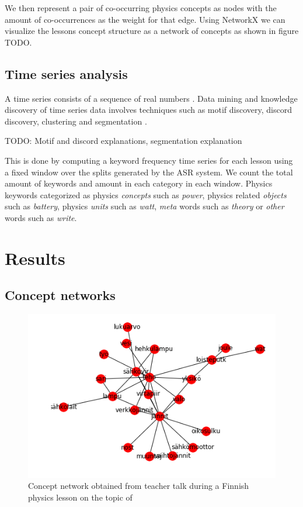 \documentclass[utf8,english]{gradu3}
\begin{document}
We then represent a pair of co-occurring physics concepts as nodes with the amount of co-occurrences as the weight for that edge. Using NetworkX \parencite{hagbergExploringNetworkStructure2008} we can visualize the lessons concept structure as a network of concepts as shown in figure TODO.

\section{Time series analysis}

A time series consists of a sequence of real numbers \parencite{yehMatrixProfileVI2017}. Data mining and knowledge discovery of time series data involves techniques such as motif discovery, discord discovery, clustering and segmentation \parencite{yehUniversalTimeSeries2018}.

TODO: Motif and discord explanations, segmentation explanation

This is done by computing a keyword frequency time series for each lesson using a fixed window over the splits generated by the ASR system. We count the total amount of keywords and amount in each category in each window. Physics keywords categorized as physics \emph{concepts} such as \emph{power}, physics related \emph{objects} such as \emph{battery}, physics \emph{units} such as \emph{watt}, \emph{meta} words such as \emph{theory} or \emph{other} words such as \emph{write}.


\chapter{Results}

\section{Concept networks}

\begin{figure}
  \includegraphics[width=\linewidth]{../figures/graph1.png}
  \caption{Concept network obtained from teacher talk during a Finnish physics lesson on the topic of }
  \label{fig:graph1}
\end{figure}
\end{document}
